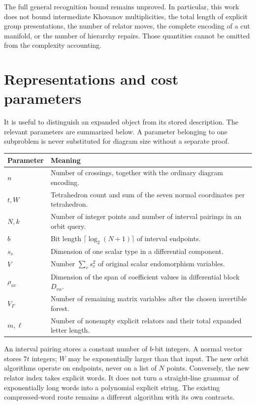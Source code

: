 \documentclass[11pt]{article}
\theoremstyle{definition}
\begin{document}
The full general recognition bound remains unproved. In particular, this
work does not bound intermediate Khovanov multiplicities, the total length
of explicit group presentations, the number of relator moves, the complete
encoding of a cut manifold, or the number of hierarchy repairs. Those
quantities cannot be omitted from the complexity accounting.

\section{Representations and cost parameters}

It is useful to distinguish an expanded object from its stored description.
The relevant parameters are summarized below. A parameter belonging to one
subproblem is never substituted for diagram size without a separate proof.

\begin{center}\small
\begin{tabularx}{\textwidth}{@{}lX@{}}
\toprule
Parameter & Meaning\\\midrule
$n$ & Number of crossings, together with the ordinary diagram encoding.\\
$t,W$ & Tetrahedron count and sum of the seven normal coordinates per tetrahedron.\\
$N,k$ & Number of integer points and number of interval pairings in an orbit query.\\
$b$ & Bit length $\lceil\log_2(N+1)\rceil$ of interval endpoints.\\
$s_v$ & Dimension of one scalar type in a differential component.\\
$V$ & Number $\sum_v s_v^2$ of original scalar endomorphism variables.\\
$\rho_{uv}$ & Dimension of the span of coefficient values in differential block $D_{vu}$.\\
$V_F$ & Number of remaining matrix variables after the chosen invertible forest.\\
$m,\ell$ & Number of nonempty explicit relators and their total expanded letter length.\\
\bottomrule
\end{tabularx}
\end{center}

An interval pairing stores a constant number of $b$-bit integers. A normal
vector stores $7t$ integers; $W$ may be exponentially larger than that input.
The new orbit algorithms operate on endpoints, never on a list of $N$
points. Conversely, the new relator index takes explicit words. It does not
turn a straight-line grammar of exponentially long words into a polynomial
explicit string. The existing compressed-word route remains a different
algorithm with its own contracts.
\end{document}
